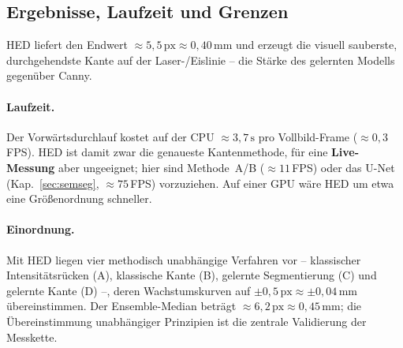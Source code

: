 \subsection{Ergebnisse, Laufzeit und Grenzen}
\label{sec:hed_ergebnisse}

HED liefert den Endwert $\approx 5{,}5\,\text{px} \approx 0{,}40\,\text{mm}$ und
erzeugt die visuell sauberste, durchgehendste Kante auf der Laser-/Eislinie -- die
Stärke des gelernten Modells gegenüber Canny.

\paragraph{Laufzeit.}
Der Vorwärtsdurchlauf kostet auf der CPU $\approx 3{,}7\,\text{s}$ pro
Vollbild-Frame ($\approx 0{,}3$\,FPS). HED ist damit zwar die genaueste
Kantenmethode, für eine \textbf{Live-Messung} aber ungeeignet; hier sind
Methode~A/B ($\approx 11$\,FPS) oder das U-Net (Kap.~\ref{sec:semseg},
$\approx 75$\,FPS) vorzuziehen. Auf einer GPU wäre HED um etwa eine
Größenordnung schneller.

\paragraph{Einordnung.}
Mit HED liegen vier methodisch unabhängige Verfahren vor -- klassischer
Intensitätsrücken (A), klassische Kante (B), gelernte Segmentierung (C) und
gelernte Kante (D) --, deren Wachstumskurven auf $\pm 0{,}5\,\text{px}
\approx \pm 0{,}04\,\text{mm}$ übereinstimmen. Der Ensemble-Median beträgt
$\approx 6{,}2\,\text{px} \approx 0{,}45\,\text{mm}$; die Übereinstimmung
unabhängiger Prinzipien ist die zentrale Validierung der Messkette.
